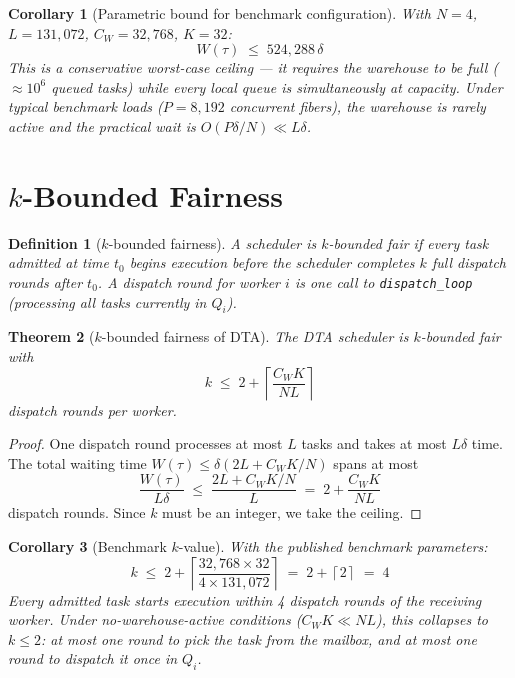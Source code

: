 \documentclass[11pt,a4paper]{report}
\newtheorem{theorem}{Theorem}[section]
\newtheorem{corollary}[theorem]{Corollary}
\newtheorem{definition}{Definition}[section]
\newcommand{\ceil}[1]{\left\lceil #1 \right\rceil}
\newcommand{\code}[1]{\texttt{#1}}
\begin{document}
\begin{corollary}[Parametric bound for benchmark configuration]
With $N=4$, $L=131{,}072$, $C_W=32{,}768$, $K=32$:
\[
  W(\tau) \;\leq\; 524{,}288\,\delta
\]
This is a \emph{conservative} worst-case ceiling --- it requires the
warehouse to be full ($\approx 10^6$ queued tasks) while every
local queue is simultaneously at capacity.  Under typical benchmark
loads ($P = 8{,}192$ concurrent fibers), the warehouse is rarely
active and the practical wait is $O(P\delta/N) \ll L\delta$.
\end{corollary}

\section{$k$-Bounded Fairness}

\begin{definition}[$k$-bounded fairness]
\label{def:kfair}
A scheduler is \emph{$k$-bounded fair} if every task admitted at
time $t_0$ begins execution before the scheduler completes $k$
full dispatch rounds after $t_0$.  A \emph{dispatch round} for
worker $i$ is one call to \code{dispatch\_loop} (processing all
tasks currently in $Q_i$).
\end{definition}

\begin{theorem}[$k$-bounded fairness of DTA]
\label{thm:kfair}
The DTA scheduler is $k$-bounded fair with
\[
  k \;\leq\; 2 + \ceil{\frac{C_W K}{NL}}
\]
dispatch rounds per worker.
\end{theorem}

\begin{proof}
One dispatch round processes at most $L$ tasks and takes at most
$L\delta$ time.  The total waiting time $W(\tau) \leq \delta(2L +
C_W K/N)$ spans at most
\[
  \frac{W(\tau)}{L\delta}
  \;\leq\; \frac{2L + C_W K/N}{L}
  \;=\; 2 + \frac{C_W K}{NL}
\]
dispatch rounds.  Since $k$ must be an integer, we take the ceiling.
\end{proof}

\begin{corollary}[Benchmark $k$-value]
With the published benchmark parameters:
\[
  k \;\leq\; 2 + \ceil{\frac{32{,}768 \times 32}{4 \times 131{,}072}}
    \;=\; 2 + \ceil{2}
    \;=\; 4
\]
Every admitted task starts execution within 4 dispatch rounds of
the receiving worker.  Under no-warehouse-active conditions
($C_W K \ll NL$), this collapses to $k \leq 2$: at most one round
to pick the task from the mailbox, and at most one round to dispatch
it once in $Q_i$.
\end{corollary}
\end{document}
